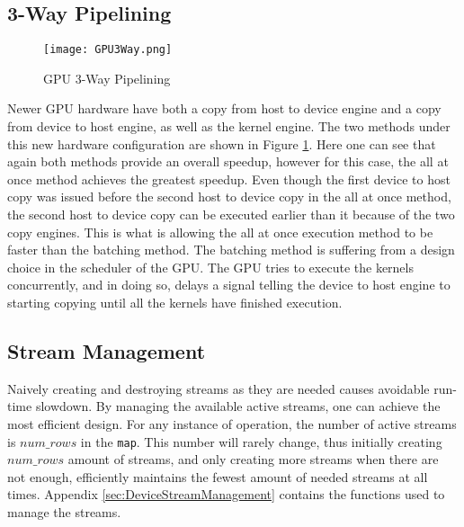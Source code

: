\subsection{3-Way Pipelining}
\begin{figure}[htp]
\centering
\texttt{[image: GPU3Way.png]}
\caption{GPU 3-Way Pipelining}
\label{fig:GPU3Way}
\end{figure}
Newer GPU hardware have both a copy from host to device engine and a copy from device to host engine, as well as the kernel engine. The two methods under this new hardware configuration are shown in Figure \ref{fig:GPU3Way}. Here one can see that again both methods provide an overall speedup, however for this case, the all at once method achieves the greatest speedup. Even though the first device to host copy was issued before the second host to device copy in the all at once method, the second host to device copy can be executed earlier than it because of the two copy engines. This is what is allowing the all at once execution method to be faster than the batching method. The batching method is suffering from a design choice in the scheduler of the GPU. The GPU tries to execute the kernels concurrently, and in doing so, delays a signal telling the device to host engine to starting copying until all the kernels have finished execution.

\subsection{Stream Management}
Naively creating and destroying streams as they are needed causes avoidable run-time slowdown. By managing the available active streams, one can achieve the most efficient design. For any instance of operation, the number of active streams is $num\_rows$ in the \verb|map|. This number will rarely change, thus initially creating $num\_rows$ amount of streams, and only creating more streams when there are not enough, efficiently maintains the fewest amount of needed streams at all times. Appendix \ref{sec:DeviceStreamManagement} contains the functions used to manage the streams.